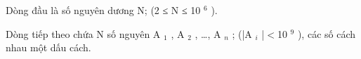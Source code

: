 Dòng đầu là số nguyên dương N; (2 ≤ N ≤ 10 $^ 6 $ ).

Dòng tiếp theo chứa N số nguyên A $_ 1 $ , A $_ 2 $ , …, A $_ n $ ; (|A $_ i $ |$<$10 $^ 9 $ ), các số cách nhau một dấu cách.

\
